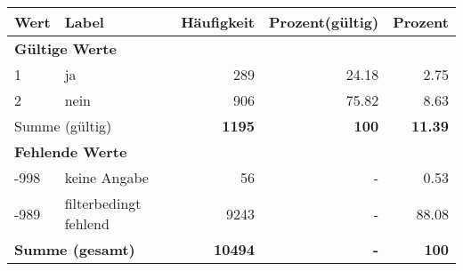      \begin{longtable}{lXrrr}
     \toprule
     \textbf{Wert} & \textbf{Label} & \textbf{Häufigkeit} & \textbf{Prozent(gültig)} & \textbf{Prozent} \\
     \endhead
     \midrule
     \multicolumn{5}{l}{\textbf{Gültige Werte}}\\

     1 &
     \multicolumn{1}{X}{ ja   } &


       \num{289} &
       \num[round-mode=places,round-precision=2]{24,18} &
         \num[round-mode=places,round-precision=2]{2,75} \\

     2 &
     \multicolumn{1}{X}{ nein   } &


       \num{906} &
       \num[round-mode=places,round-precision=2]{75,82} &
         \num[round-mode=places,round-precision=2]{8,63} \\
     \midrule
     \multicolumn{2}{l}{Summe (gültig)} &
       \textbf{\num{1195}} &
     \textbf{100} &
       \textbf{\num[round-mode=places,round-precision=2]{11,39}} \\
     \multicolumn{5}{l}{\textbf{Fehlende Werte}}\\
       -998 &
       keine Angabe &
         \num{56} &
        - &
         \num[round-mode=places,round-precision=2]{0,53} \\
       -989 &
       filterbedingt fehlend &
         \num{9243} &
        - &
         \num[round-mode=places,round-precision=2]{88,08} \\
     \midrule
     \multicolumn{2}{l}{\textbf{Summe (gesamt)}} &
          \textbf{\num{10494}} &
        \textbf{-} &
        \textbf{100} \\
     \bottomrule
     \end{longtable}
     
